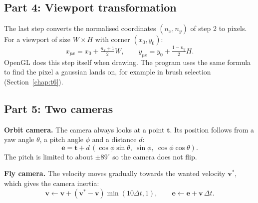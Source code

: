 \documentclass[9pt,twocolumn,a4paper]{extarticle}
\begin{document}
\par\noindent{}\par\vspace{3pt}

\subsection{Part 4: Viewport transformation}
\label{sec:viewport}
The last step converts the normalised coordinates $(n_x,n_y)$ of step 2 to pixels. For a viewport of size $W\times H$ with corner $(x_0,y_0)$:
\begin{equation}
x_{px}=x_0+\tfrac{n_x+1}{2}W,\qquad y_{px}=y_0+\tfrac{1-n_y}{2}H.
\label{eq:pixel}
\end{equation}
OpenGL does this step itself when drawing. The program uses the same formula to find the pixel a gaussian lands on, for example in brush selection (Section~\ref{chap:t6}).

\par\noindent{}\par\vspace{3pt}

\subsection{Part 5: Two cameras}
\textbf{Orbit camera.} The camera always looks at a point $\mathbf{t}$. Its position follows from a yaw angle $\theta$, a pitch angle $\phi$ and a distance $d$:
\begin{equation}
\mathbf{e}=\mathbf{t}+d\,(\cos\phi\sin\theta,\ \sin\phi,\ \cos\phi\cos\theta).
\label{eq:eye}
\end{equation}
The pitch is limited to about $\pm89^{\circ}$ so the camera does not flip.

\par\noindent{}\par\vspace{3pt}

\textbf{Fly camera.} The velocity moves gradually towards the wanted velocity $\mathbf{v}^{*}$, which gives the camera inertia:
\begin{equation}
\mathbf{v}\leftarrow\mathbf{v}+(\mathbf{v}^{*}-\mathbf{v})\min(10\Delta t,1),\qquad
\mathbf{e}\leftarrow\mathbf{e}+\mathbf{v}\,\Delta t.
\label{eq:fly}
\end{equation}
\end{document}
